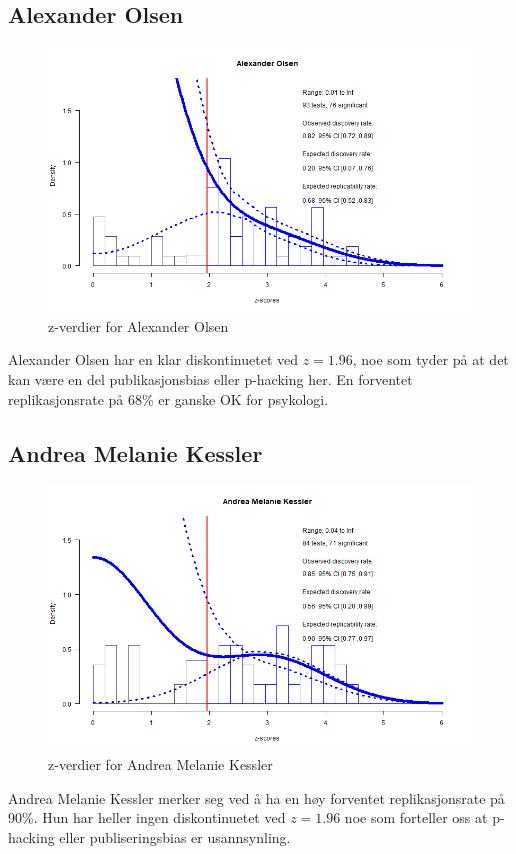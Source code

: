 \documentclass[doc,norsk]{apa7}
\begin{document}



\subsection{Alexander Olsen}
\begin{figure}[h!]
    \centering
    \includegraphics[width=\textwidth]{images/Alexander Olsen.png}
    \caption{z-verdier for Alexander Olsen}
\end{figure}
Alexander Olsen har en klar diskontinuetet ved $z=1.96$, noe som tyder på at det kan være en del publikasjonsbias eller p-hacking her. En forventet replikasjonsrate på 68\% er ganske OK for psykologi.

\subsection{Andrea Melanie Kessler}
\begin{figure}[h!]
    \centering
    \includegraphics[width=\textwidth]{images/Andrea Melanie Kessler.png}
    \caption{z-verdier for Andrea Melanie Kessler}
\end{figure}
Andrea Melanie Kessler merker seg ved å ha en høy forventet replikasjonsrate på 90\%. Hun har heller ingen diskontinuetet ved $z=1.96$ noe som forteller oss at p-hacking eller publiseringsbias er usannsynling.
\end{document}
